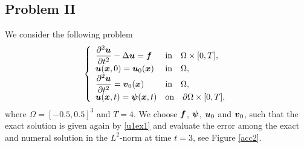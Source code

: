 \documentclass[english,a4paper]{article}
\newcommand{\psibf}{\text{\mbox{\boldmath $\psi$}}}
\newcommand{\ubf}{\text{\mbox{\boldmath $u$}}}
\newcommand{\vbf}{\text{\mbox{\boldmath $v$}}}
\newcommand{\xbf}{\text{\mbox{\boldmath $x$}}}
\newcommand{\fbf}{\text{\mbox{\boldmath $f$}}}
\begin{document}
\subsection{Problem II}
We consider the following problem
\begin{equation}\label{ex2}
\left\{
\begin{array}{ll}
\displaystyle\frac{\partial^2 \ubf}{\partial t^2} -\Delta \ubf = \fbf & \text{in}\quad
\Omega\times [0,T],\\
\displaystyle\ubf(\xbf, 0) =  \ubf_0(\xbf)  & \text{in}\quad \Omega,\\
\displaystyle\frac{\partial^2 \ubf}{\partial t^2} =  \vbf_0(\xbf)  & \text{in}\quad \Omega,\\
\displaystyle\ubf(\xbf, t) = \psibf(\xbf, t)   & \text{on}\quad \partial\Omega\times[0,T],
\end{array}
\right.
\end{equation}
where $\Omega=[-0.5, 0.5]^3$ and $T=4$.
We choose $\fbf$, $\psibf$, $\ubf_0$ and $\vbf_0$, such that the exact solution
is given again by \eqref{u1ex1} and  evaluate the error
among the exact  and numeral solution in the $L^2$-norm  at
 time $t=3$, see Figure \ref{acc2}.
\end{document}
